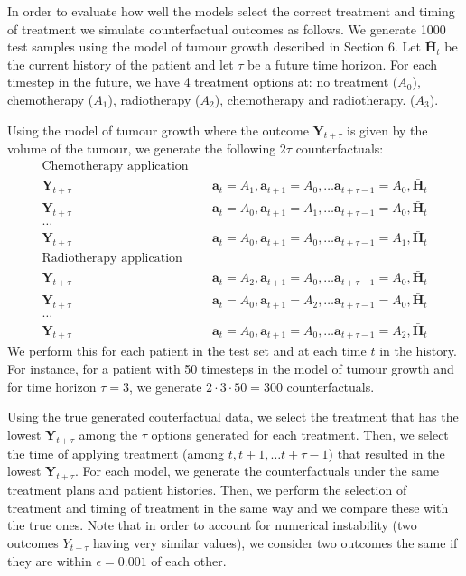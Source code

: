 \documentclass{article} %
\newcommand{\vc}[1]{\mathbf{#1}}
\newcommand{\hist}[1]{\bar{\vc{#1}}}
\begin{document}
	In order to evaluate how well the models select the correct treatment and timing of treatment we simulate counterfactual outcomes as follows. We generate 1000 test samples using the model of tumour growth described in Section 6. Let $\hist{H}_t$ be the current history of the patient and let $\tau$ be a future time horizon. For each timestep in the future, we have 4 treatment options at: no treatment ($A_0$), chemotherapy ($A_1$), radiotherapy ($A_2$), chemotherapy and radiotherapy. ($A_3$).  
	
	Using the model of tumour growth where the outcome $\vc{Y}_{t+\tau}$ is given by the volume of the tumour, we generate the following $2\tau$ counterfactuals:
	\begin{eqnarray}
			\text{Chemotherapy application} \nonumber \\
	\vc{Y}_{t+\tau} &\mid& \vc{a}_{t} = A_1, \vc{a}_{t+1} = A_0, \dots \vc{a}_{t+ \tau - 1} = A_0, \hist{H}_t \\
	\vc{Y}_{t+\tau} &\mid& \vc{a}_{t} = A_0, \vc{a}_{t+1} = A_1, \dots \vc{a}_{t+ \tau - 1} = A_0, \hist{H}_t \\
	\dots \nonumber \\
	\vc{Y}_{t+\tau} &\mid& \vc{a}_{t} = A_0, \vc{a}_{t+1} = A_0, \dots \vc{a}_{t+ \tau - 1} = A_1, \hist{H}_t\\
		\text{Radiotherapy application} \nonumber \\
	\vc{Y}_{t+\tau} &\mid& \vc{a}_{t} = A_2, \vc{a}_{t+1} = A_0, \dots \vc{a}_{t+ \tau - 1} = A_0, \hist{H}_t \\
	\vc{Y}_{t+\tau} &\mid& \vc{a}_{t} = A_0, \vc{a}_{t+1} = A_2, \dots \vc{a}_{t+ \tau - 1} = A_0, \hist{H}_t \\
	\dots \nonumber \\
	\vc{Y}_{t+\tau} &\mid& \vc{a}_{t} = A_0, \vc{a}_{t+1} = A_0, \dots \vc{a}_{t+ \tau - 1} = A_2, \hist{H}_t
	\end{eqnarray}
	We perform this for each patient in the test set and at each time $t$ in the history. For instance, for a patient with 50 timesteps in the model of tumour growth and for time horizon $\tau=3$, we generate $2 \cdot 3 \cdot 50 = 300$ counterfactuals. 

	Using the true generated couterfactual data, we select the treatment that has the lowest $\vc{Y}_{t+\tau}$ among the $\tau$ options generated for each treatment. Then, we select the time of applying treatment (among $t, t+1, \dots t+\tau-1$) that resulted in the lowest $\vc{Y}_{t+\tau}$. For each model, we generate the counterfactuals under the same treatment plans and patient histories. Then, we perform the selection of treatment and timing of treatment in the same way and we compare these with the true ones. Note that in order to account for numerical instability (two outcomes $Y_{t+\tau}$ having very similar values), we consider two outcomes the same if they are within $\epsilon = 0.001$ of each other.
\end{document}

